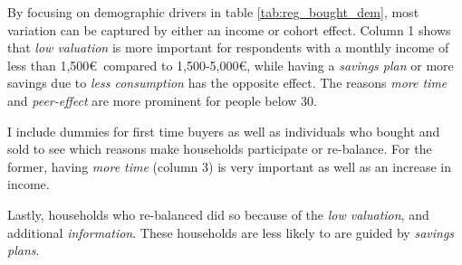 \documentclass[ProjectABM]{subfiles}
\begin{document}


By focusing on demographic drivers in table \ref{tab:reg_bought_dem}, most variation can be captured by either an income or cohort effect. Column 1 shows that \textit{low valuation} is more important for respondents with a monthly income of less than 1,500\euro\ compared to 1,500-5,000\euro, while having a \textit{savings plan} or more savings due to \textit{less consumption} has the opposite effect. The reasons \textit{more time} and \textit{peer-effect} are more prominent for people below 30.

I include dummies for first time buyers as well as individuals who bought and sold to see which reasons make households participate or re-balance. For the former, having \textit{more time} (column 3) is very important as well as an increase in income. %

Lastly, households who re-balanced did so because of the \textit{low valuation}, and additional \textit{information}. These households are less likely to are guided by \textit{savings plans}.


\end{document}
